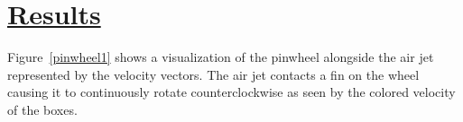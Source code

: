 \newpage

\section*{\underline{Results}}


\begin{figure}
  \centering
  \vspace{-40pt}
  \hspace{10pt}
  \caption{}
  \label{fig:mpmice4}

\end{figure}

Figure~\ref{pinwheel1} shows a visualization of the pinwheel alongside the air jet represented by the velocity vectors. The air jet contacts a fin on the wheel causing it to continuously rotate counterclockwise as seen by the colored velocity of the boxes.  

%
%
